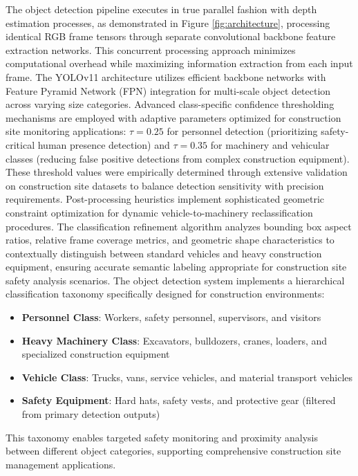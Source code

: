 \documentclass{article}
\begin{document}
The object detection pipeline executes in true parallel fashion with depth estimation processes, as demonstrated in Figure \ref{fig:architecture}, processing identical RGB frame tensors through separate convolutional backbone feature extraction networks. This concurrent processing approach minimizes computational overhead while maximizing information extraction from each input frame. The YOLOv11 architecture utilizes efficient backbone networks with Feature Pyramid Network (FPN) integration for multi-scale object detection across varying size categories. Advanced class-specific confidence thresholding mechanisms are employed with adaptive parameters optimized for construction site monitoring applications: $\tau=0.25$ for personnel detection (prioritizing safety-critical human presence detection) and $\tau=0.35$ for machinery and vehicular classes (reducing false positive detections from complex construction equipment). These threshold values were empirically determined through extensive validation on construction site datasets to balance detection sensitivity with precision requirements. Post-processing heuristics implement sophisticated geometric constraint optimization for dynamic vehicle-to-machinery reclassification procedures. The classification refinement algorithm analyzes bounding box aspect ratios, relative frame coverage metrics, and geometric shape characteristics to contextually distinguish between standard vehicles and heavy construction equipment, ensuring accurate semantic labeling appropriate for construction site safety analysis scenarios. The object detection system implements a hierarchical classification taxonomy specifically designed for construction environments:
\begin{itemize}
    \item \textbf{Personnel Class}: Workers, safety personnel, supervisors, and visitors
    \item \textbf{Heavy Machinery Class}: Excavators, bulldozers, cranes, loaders, and specialized construction equipment
    \item \textbf{Vehicle Class}: Trucks, vans, service vehicles, and material transport vehicles
    \item \textbf{Safety Equipment}: Hard hats, safety vests, and protective gear (filtered from primary detection outputs)
\end{itemize}
This taxonomy enables targeted safety monitoring and proximity analysis between different object categories, supporting comprehensive construction site management applications.
\end{document}

